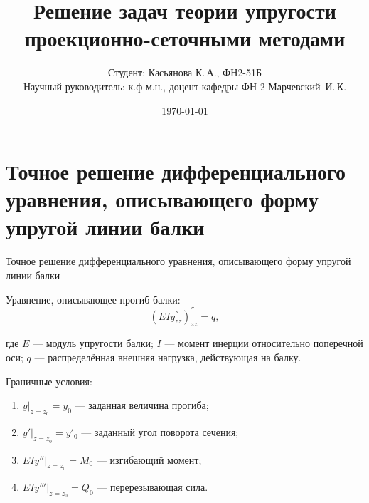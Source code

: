 \documentclass[7pt]{beamer}
\title{Решение задач теории упругости проекционно-сеточными методами}
\author{Студент: Касьянова К.\,А., ФН2-51Б\\ \vspace*{5mm}
Научный руководитель: к.ф-м.н., доцент кафедры ФН-2 Марчевский~И.\,К.}
\date{\today}
\numberwithin{equation}{section}
\begin{document}

\begin{frame}[plain]
	\maketitle
\end{frame}

\section{Точное решение дифференциального уравнения, описывающего форму упругой линии балки}

\begin{frame}{Точное решение дифференциального уравнения, описывающего форму упругой линии балки} 
	\begin{block}{Уравнение, описывающее прогиб балки:}
	\[(EIy^{''}_{zz})^{''}_{zz}=q,\]
	\end{block}	
	где $E$ --- модуль упругости балки; $I$ --- момент инерции относительно поперечной оси; $q$ --- распределённая внешняя нагрузка, действующая на балку. \\
 
	\begin{block}{Граничные условия:}
		\begin{enumerate}
		\item $y|_{z=z_{0}}=y_{0}$ --- заданная величина прогиба;
		\item $y'|_{z=z_{0}}=y'_{0}$ --- заданный угол поворота сечения;
		\item $EIy''|_{z=z_{0}}=M_{0}$ --- изгибающий момент;
		\item $EIy'''|_{z=z_{0}}= Q_{0}$ --- перерезывающая сила.
		\end{enumerate}
	\end{block}	
\end{frame}
\end{document}
